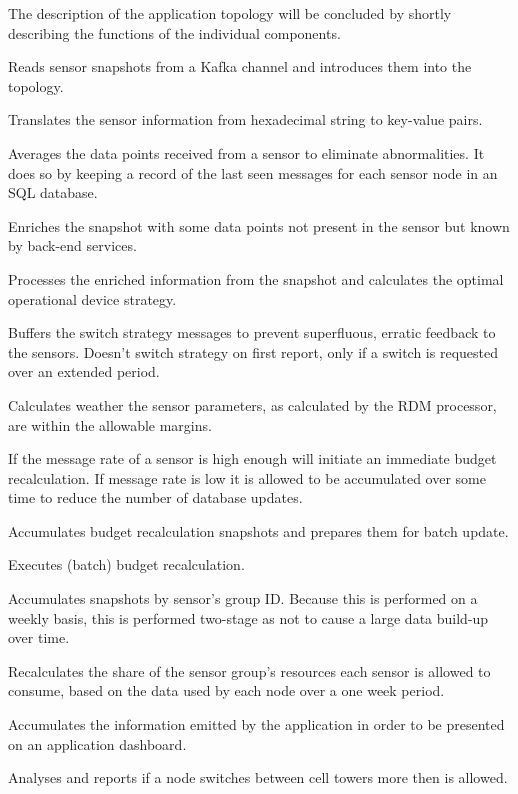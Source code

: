 The description of the application topology will be concluded by shortly describing the functions of the individual components.
\begin{description}[style=nextline]
\nospace
\item[Sensit spout] Reads sensor snapshots from a Kafka channel and introduces them into the topology.
\item[Translator] Translates the sensor information from hexadecimal string to key-value pairs.
\item[Nuancer] Averages the data points received from a sensor to eliminate abnormalities. It does so by keeping a record of the last seen messages for each sensor node in an SQL database.
\item[Attributor] Enriches the snapshot with some data points not present in the sensor but known by  back-end services.
\item[Sensor RDM processor] Processes the enriched information from the snapshot and calculates the optimal operational device strategy.
\item[Switch strategy buffer] Buffers the switch strategy messages to prevent superfluous, erratic feedback to the sensors. Doesn't switch strategy on first report, only if a switch is requested over an extended period.
\item[Single message analyser] Calculates weather the sensor parameters, as calculated by the RDM processor, are within the allowable margins.
\item[Budget recalculator interface]If the message rate of a sensor is high enough will initiate an immediate budget recalculation. If message rate is low it is allowed to be accumulated over some time to reduce the number of database updates.
\item[Budget recalculator accumulator] Accumulates budget recalculation snapshots and prepares them for batch update.
\item[Budget recalculator] Executes (batch) budget recalculation.
\item[Group accumulator] Accumulates snapshots by sensor's group ID. Because this is performed on a weekly basis, this is performed two-stage as not to cause a large data build-up over time.
\item[Group share recalculator] Recalculates the share of the sensor group's resources each sensor is allowed to consume, based on the data used by each node over a one week period.
\item[Application accumulator] Accumulates the information emitted by the application in order to be presented on an application dashboard.
\item[Cell switch analyser] Analyses and reports if a node switches between cell towers more then is allowed.
\end{description}

